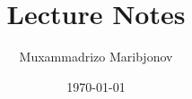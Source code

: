 \documentclass[11pt]{report}
\title{\textbf{\coursetitle} \\ \large Lecture Notes}
\author{Muxammadrizo Maribjonov}
\date{\today}
\begin{document}
\maketitle
\tableofcontents





\nocite{goodfellow2016deep}

\end{document}
